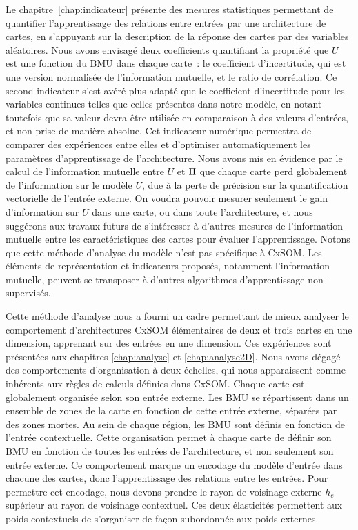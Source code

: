 Le chapitre~\ref{chap:indicateur} présente des mesures statistiques permettant de quantifier l'apprentissage des relations entre entrées par une architecture de cartes, en s'appuyant sur la description de la réponse des cartes par des variables aléatoires.
Nous avons envisagé deux coefficients quantifiant la propriété que $U$ est une fonction du BMU dans chaque carte~: le coefficient d'incertitude, qui est une version normalisée de l'information mutuelle, et le ratio de corrélation.
Ce second indicateur s'est avéré plus adapté que le coefficient d'incertitude pour les variables continues telles que celles présentes dans notre modèle, en notant toutefois que sa valeur devra être utilisée en comparaison à des valeurs d'entrées, et non prise de manière absolue. 
Cet indicateur numérique permettra de comparer des expériences entre elles et d'optimiser automatiquement les paramètres d'apprentissage de l'architecture.
Nous avons mis en évidence par le calcul de l'information mutuelle entre $U$ et $\Pi$ que chaque carte perd  globalement de l'information sur le modèle $U$, due à la perte de précision sur la quantification vectorielle de l'entrée externe. On voudra pouvoir mesurer seulement le gain d'information sur $U$ dans une carte, ou dans toute l'architecture, et nous suggérons aux travaux futurs de s'intéresser à d'autres mesures de l'information mutuelle entre les caractéristiques des cartes pour évaluer l'apprentissage.
Notons que cette méthode d'analyse du modèle n'est pas spécifique à CxSOM. Les éléments de représentation et indicateurs proposés, notamment l'information mutuelle, peuvent se transposer à d'autres algorithmes d'apprentissage non-supervisés.

Cette méthode d'analyse nous a fourni un cadre permettant de mieux analyser le comportement d'architectures CxSOM élémentaires de deux et trois cartes en une dimension, apprenant sur des entrées en une dimension.
Ces expériences sont présentées aux chapitres \ref{chap:analyse} et \ref{chap:analyse2D}.
Nous avons dégagé des comportements d'organisation à deux échelles, qui nous apparaissent comme inhérents aux règles de calculs définies dans CxSOM. Chaque carte est globalement organisée selon son entrée externe. Les BMU se répartissent dans un ensemble de zones de la carte en fonction de cette entrée externe, séparées par des zones mortes. Au sein de chaque région, les BMU sont définis en fonction de l'entrée contextuelle. 
Cette organisation permet à chaque carte de définir son BMU en fonction de toutes les entrées de l'architecture, et non seulement son entrée externe. Ce comportement marque un encodage du modèle d'entrée dans chacune des cartes, donc l'apprentissage des relations entre les entrées.
Pour permettre cet encodage, nous devons prendre le rayon de voisinage externe $h_e$ supérieur au rayon de voisinage contextuel. Ces deux élasticités permettent aux poids contextuels de s'organiser de façon subordonnée aux poids externes.


